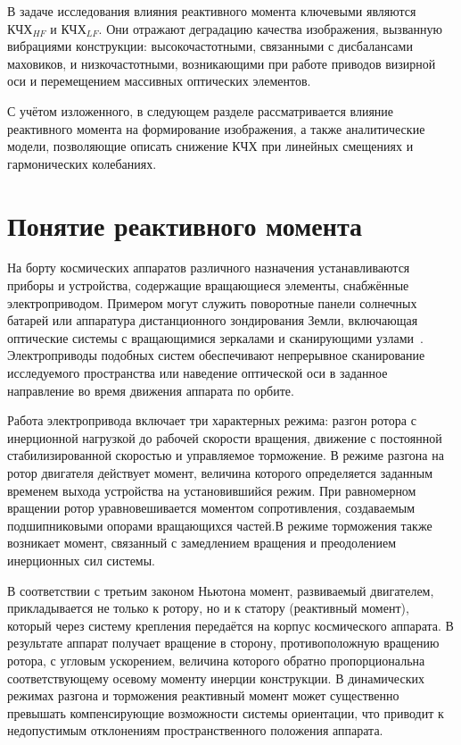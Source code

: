В задаче исследования влияния реактивного момента ключевыми являются \(\text{КЧХ}_{HF}\) и \(\text{КЧХ}_{LF}\). Они отражают деградацию качества изображения, вызванную вибрациями конструкции: высокочастотными, связанными с дисбалансами маховиков, и низкочастотными, возникающими при работе приводов визирной оси и перемещением массивных оптических элементов.

С учётом изложенного, в следующем разделе рассматривается влияние реактивного момента на формирование  изображения, а также аналитические модели, позволяющие описать снижение КЧХ при линейных смещениях и гармонических колебаниях.

	




\section{Понятие реактивного момента}

На борту космических аппаратов различного назначения устанавливаются приборы и устройства, содержащие вращающиеся элементы, снабжённые электроприводом. Примером могут служить поворотные панели солнечных батарей или аппаратура дистанционного зондирования Земли, включающая оптические системы с вращающимися зеркалами и сканирующими узлами~\cite{Pantenkov2022}. Электроприводы подобных систем обеспечивают непрерывное сканирование исследуемого пространства или наведение оптической оси в заданное направление во время движения аппарата по орбите.

Работа электропривода включает три характерных режима: разгон ротора с инерционной нагрузкой до рабочей скорости вращения, движение с постоянной стабилизированной скоростью и управляемое торможение. В режиме разгона на ротор двигателя действует момент, величина которого определяется заданным временем выхода устройства на установившийся режим. При равномерном вращении ротор уравновешивается моментом сопротивления, создаваемым подшипниковыми опорами вращающихся частей.В режиме торможения также возникает момент, связанный с замедлением вращения и преодолением инерционных сил системы.

В соответствии с третьим законом Ньютона момент, развиваемый двигателем, прикладывается не только к ротору, но и к статору (реактивный момент), который через систему крепления передаётся на корпус космического аппарата. В результате аппарат получает вращение в сторону, противоположную вращению ротора, с угловым ускорением, величина которого обратно пропорциональна соответствующему осевому моменту инерции конструкции. В динамических режимах разгона и торможения реактивный момент может существенно превышать компенсирующие возможности системы ориентации, что приводит к недопустимым отклонениям пространственного положения аппарата.

